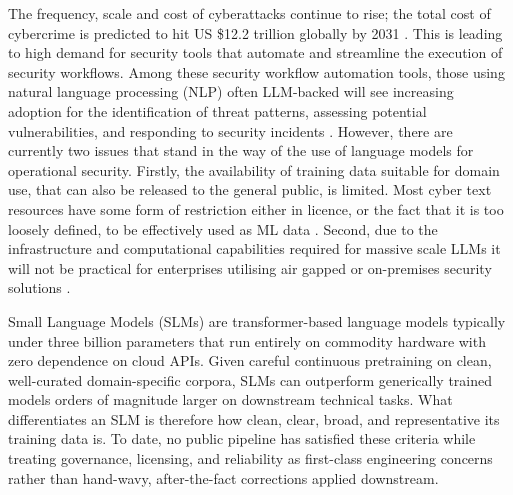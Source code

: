 \documentclass[conference]{IEEEtran}
\begin{document}
The frequency, scale and cost of cyberattacks continue to rise; the total cost of cybercrime is predicted to hit US \$12.2 trillion globally by 2031 \cite{braue2025cybercrime}. This is leading to high demand for security tools that automate and streamline the execution of security workflows. Among these security workflow automation tools, those using natural language processing (NLP) often LLM-backed will see increasing adoption for the identification of threat patterns, assessing potential vulnerabilities, and responding to security incidents \cite{zhang2025llms, ferrag2024revolutionising}.
However, there are currently two issues that stand in the way of the use of language models for operational security. Firstly, the availability of training data suitable for domain use, that can also be released to the general public, is limited. Most cyber text resources have some form of restriction either in licence, or the fact that it is too loosely defined, to be effectively used as ML data \cite{yu2025primus}. Second, due to the infrastructure and computational capabilities required for massive scale LLMs it will not be practical for enterprises utilising air gapped or on-premises security solutions \cite{minaee2024llm}.

Small Language Models (SLMs) are transformer-based language models typically under three billion parameters \cite{minaee2024llm} that run entirely on commodity hardware with zero dependence on cloud APIs. Given careful continuous pretraining on clean, well-curated domain-specific corpora, SLMs can outperform generically trained models orders of magnitude larger on downstream technical tasks. What differentiates an SLM is therefore how clean, clear, broad, and representative its training data is. To date, no public pipeline has satisfied these criteria while treating governance, licensing, and reliability as first-class engineering concerns rather than hand-wavy, after-the-fact corrections applied downstream.
\end{document}

